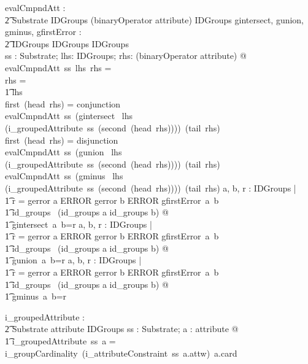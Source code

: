 \documentclass{article}
\begin{document}
\begin{gendef}
   evalCmpndAtt : \\
\t2 Substrate \fun IDGroups \fun \seq (binaryOperator \cross attribute) \fun IDGroups
\also
   gintersect, gunion, gminus, gfirstError : \\
\t2 IDGroups \fun IDGroups \fun IDGroups \\
\where
   \forall ss : Substrate; lhs: IDGroups; rhs: \seq (binaryOperator \cross attribute) @ \\
  evalCmpndAtt~ss~lhs~rhs = \\
 \IF rhs = \langle \rangle \\
\t1 \THEN lhs \\
\ELSE \IF first~(head~rhs) = conjunction \\
\THEN  evalCmpndAtt~ss~(gintersect~ lhs (i\_groupedAttribute~ss~(second~(head~rhs))))~(tail~rhs) \\
 \ELSE \IF first~(head~rhs)  = disjunction \\
\THEN  evalCmpndAtt~ss~(gunion~ lhs (i\_groupedAttribute~ss~(second~(head~rhs))))~(tail~rhs) \\
 \ELSE evalCmpndAtt~ss~(gminus~ lhs (i\_groupedAttribute~ss~(second~(head~rhs))))~(tail~rhs) 
\also
   \forall a, b, r : IDGroups | \\
\t1 r = \IF gerror \inv a \in ERROR \lor gerror \inv b \in ERROR \THEN gfirstError~a~b \\
\t1 \ELSE id\_groups ~(id\_groups \inv a \cap id\_groups \inv b) @ \\
\t1 gintersect~a~b=r
\also
   \forall a, b, r : IDGroups | \\
\t1 r = \IF gerror \inv a \in ERROR \lor gerror \inv b \in ERROR \THEN gfirstError~a~b \\
\t1 \ELSE id\_groups ~(id\_groups \inv a \cup id\_groups \inv b) @ \\
\t1 gunion~a~b=r
\also
   \forall a, b, r : IDGroups | \\
\t1 r = \IF gerror \inv a \in ERROR \lor gerror \inv b \in ERROR \THEN gfirstError~a~b \\
\t1 \ELSE id\_groups ~(id\_groups \inv a \setminus id\_groups \inv b) @ \\
\t1 gminus~a~b=r
\end{gendef}
\begin{gendef}
   i\_groupedAttribute : \\
\t2 Substrate \fun attribute \fun IDGroups
\where
\forall ss : Substrate; a : attribute @ \\
\t1 i\_groupedAttribute~ss~a =  i\_groupCardinality~(i\_attributeConstraint~ss~a.attw)~a.card \\
\end{gendef}
\end{document}
